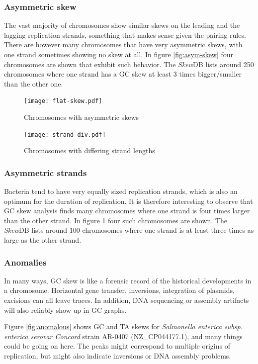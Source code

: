 \documentclass[fleqn,10pt]{wlscirep}
\begin{document}
\subsubsection*{Asymmetric skew}
The vast majority of chromosomes show similar skews on the leading and the lagging replication strands, something that makes sense given the pairing rules. There are however many chromosomes that have very asymmetric skews, with one strand sometimes showing no skew at all. In figure \ref{fig:asym-skew} four chromosomes are shown that exhibit such behavior. The \emph{Skew}DB lists around 250 chromosomes where one strand has a GC skew at least 3 times bigger/smaller than the other one.

\begin{figure}[ht]
  \centering
  \begin{minipage}[b]{0.45\linewidth}
    \texttt{[image: flat-skew.pdf]}
    \caption{Chromosomes with asymmetric skews}
    \label{fig:asym-skew}
  \end{minipage}
  \quad
  \begin{minipage}[b]{0.45\linewidth}
    \texttt{[image: strand-div.pdf]}
    \caption{Chromosomes with differing strand lengths}
    \label{fig:strand-div}
  \end{minipage}
\end{figure}

\subsubsection*{Asymmetric strands}
Bacteria tend to have very equally sized replication strands, which is also an optimum for the duration of replication. It is therefore interesting to observe that GC skew analysis finds many chromosomes where one strand is four times larger than the other strand.  In  figure \ref{fig:strand-div} four such chromosomes are shown. The \emph{Skew}DB lists around 100 chromosomes where one strand is at least three times as large as the other strand.


\subsubsection*{Anomalies}
In many ways, GC skew is like a forensic record of the historical developments in a chromosome. Horizontal gene transfer, inversions, integration of plasmids, excisions can all leave traces. In addition, DNA sequencing or assembly artifacts will also reliably show up in GC graphs.

Figure \ref{fig:anomalous} shows GC and TA skews for \emph{Salmonella enterica subsp. enterica serovar Concord} strain AR-0407 (NZ\_CP044177.1), and many things could be going on here. The peaks might correspond to multiple origins of replication, but might also indicate inversions or DNA assembly problems.
\end{document}
